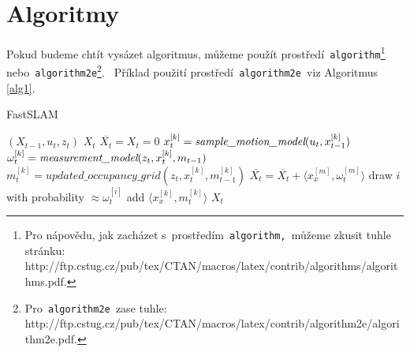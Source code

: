 \documentclass[11pt,a4paper]{article}
\begin{document}
\section{Algoritmy} \label{algo}
  Pokud budeme chtít vysázet algoritmus, můžeme použít prostředí\texttt{ algorithm}\footnote{
  Pro nápovědu, jak zacházet s~prostředím\texttt{ algorithm, }můžeme zkusit
  tuhle stránku: \\http://ftp.cstug.cz/pub/tex/CTAN/macros/latex/contrib/algorithms/algorithms.pdf.}
  nebo\texttt{ algorithm2e}\footnote{Pro\texttt{ algorithm2e }zase tuhle:
  http://ftp.cstug.cz/pub/tex/CTAN/macros/latex/contrib/algorithm2e/algorithm2e.pdf.}.\texttt{ }
  Příklad použití prostředí\texttt{ algorithm2e }viz Algoritmus \ref{alg1}.
  \begin{algorithm}
    \caption{\sc FastSLAM}
    \label{alg1}
    \begin{algorithmic}[1]
      \REQUIRE $(X_{t-1},u_t,z_t)$
      \ENSURE $X_t$
      \medskip
      \STATE $\overline{X_t}=X_t=0$
        \STATE $x_t^{[k]}=\emph{sample\_motion\_model}(u_t,x_{t-1}^{[k]})$
        \STATE $\omega_t^{[k]}=\emph{measurement\_model}(z_t,x_t^{[k]},m_{t-1})$
        \STATE $m_t^{[k]}=updated\_occupancy\_grid(z_t,x_t^{[k]},m_{t-1}^{[k]})$
        \STATE $\overline{X_t}=\overline{X_t}+\langle x_x^{[m]},\omega_t^{[m]}\rangle$
      \ENDFOR
        \STATE draw $i$ with probability $\approx \omega_t^{[i]}$
        \STATE add $\langle x_x^{[k]},m_t^{[k]}\rangle$ \TO $X_t$
      \ENDFOR
    \end{algorithmic}
  \end{algorithm}
\end{document}
